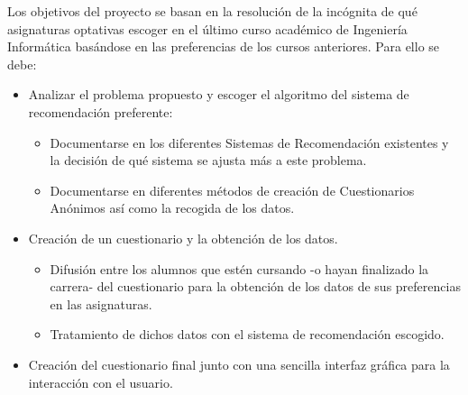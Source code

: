 Los objetivos del proyecto se basan en la resolución de la incógnita de qué asignaturas optativas escoger en el último curso académico de Ingeniería Informática basándose en las preferencias de los cursos anteriores. Para ello se debe: 
\begin{itemize}
\item Analizar el problema propuesto y escoger el algoritmo del sistema de recomendación preferente: 
\begin{itemize}
\item Documentarse en los diferentes Sistemas de Recomendación existentes y la decisión de qué sistema se ajusta más a este problema. 
\item Documentarse en diferentes métodos de creación de Cuestionarios Anónimos así como la recogida de los datos. 
\end{itemize}
\item Creación de un cuestionario y la obtención de los datos. 
\begin{itemize}
\item Difusión entre  los alumnos que estén cursando -o hayan finalizado la carrera- del cuestionario para la obtención de los datos de sus preferencias en las asignaturas. 
\item Tratamiento de dichos datos con el sistema de recomendación escogido.
\end{itemize}
\item Creación del cuestionario final junto con una sencilla interfaz gráfica para la interacción con el usuario. 
\end{itemize}